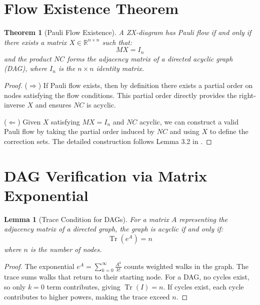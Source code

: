 \documentclass{article}
\newtheorem{theorem}{Theorem}
\newtheorem{lemma}{Lemma}
\begin{document}
\section{Flow Existence Theorem}

\begin{theorem}[Pauli Flow Existence]
A ZX-diagram has Pauli flow if and only if there exists a matrix $X \in \mathbb{R}^{n \times n}$ such that:
\begin{equation}
MX = I_n
\end{equation}
and the product $NC$ forms the adjacency matrix of a directed acyclic graph (DAG), where $I_n$ is the $n \times n$ identity matrix.
\end{theorem}

\begin{proof}
($\Rightarrow$) If Pauli flow exists, then by definition \cite{Mitosek2026} there exists a partial order on nodes satisfying the flow conditions. This partial order directly provides the right-inverse $X$ and ensures $NC$ is acyclic.

($\Leftarrow$) Given $X$ satisfying $MX = I_n$ and $NC$ acyclic, we can construct a valid Pauli flow by taking the partial order induced by $NC$ and using $X$ to define the correction sets. The detailed construction follows Lemma 3.2 in \cite{Backens2021}.
\end{proof}

\section{DAG Verification via Matrix Exponential}

\begin{lemma}[Trace Condition for DAGs]
For a matrix $A$ representing the adjacency matrix of a directed graph, the graph is acyclic if and only if:
\begin{equation}
\operatorname{Tr}(e^A) = n
\end{equation}
where $n$ is the number of nodes.
\end{lemma}

\begin{proof}
The exponential $e^A = \sum_{k=0}^{\infty} \frac{A^k}{k!}$ counts weighted walks in the graph. The trace sums walks that return to their starting node. For a DAG, no cycles exist, so only $k=0$ term contributes, giving $\operatorname{Tr}(I) = n$. If cycles exist, each cycle contributes to higher powers, making the trace exceed $n$.
\end{proof}
\end{document}

